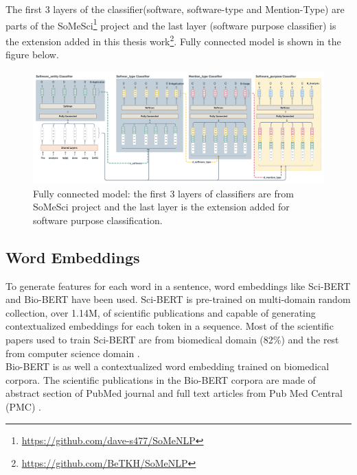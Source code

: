 The first 3 layers of the classifier(software, software-type and Mention-Type) are parts of the \ac{SoMeSci}\footnote{\url{https://github.com/dave-s477/SoMeNLP}} project and the last layer (software purpose classifier) is the extension added in this thesis work\footnote{\url{https://github.com/BeTKH/SoMeNLP}}. Fully connected model is shown in the figure below.

\begin{figure}[htbp]
	\centering
	\includegraphics[width=1\textwidth]{4.graphics/figures/ch_5/fully_connected_model}
	\caption{Fully connected model: the first 3 layers of classifiers are from \ac{SoMeSci} project and the last layer is the extension added for software purpose classification.}
	\label{fig:chapter05:setup}
\end{figure}

\subsection{Word Embeddings}
\label{sec:chapter05:DLModels:wemb}

To generate features for each word in a sentence, word embeddings like \ac{Sci-BERT} and \ac{Bio-BERT} have been used. Sci-BERT is pre-trained on multi-domain random collection, over 1.14M, of scientific publications and capable of generating contextualized embeddings for each token in a sequence. Most of the scientific papers used to train Sci-BERT are from biomedical domain (82\%) and the rest from computer science domain \citep{beltagy2019scibert}. \\

Bio-BERT is as well a contextualized word embedding trained on biomedical corpora. The scientific publications in the Bio-BERT corpora are made of abstract section of PubMed journal and full text articles from Pub Med Central (PMC) \citep{li2019fine}. 



